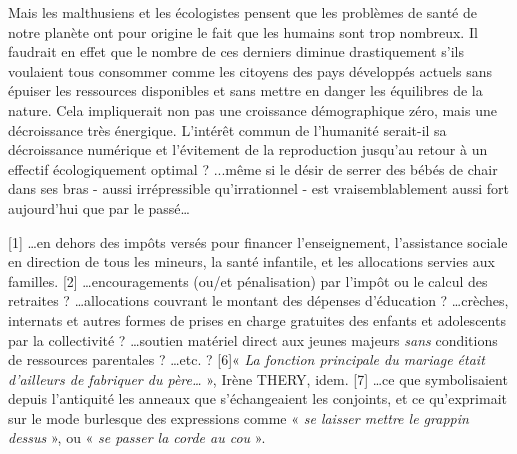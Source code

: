  Mais les malthusiens et les écologistes pensent que les problèmes de santé de notre planète ont pour origine le fait que les humains sont trop nombreux. Il faudrait en effet que le nombre de ces derniers diminue drastiquement s'ils voulaient tous consommer comme les citoyens des pays développés actuels sans épuiser les ressources disponibles et sans mettre en danger les équilibres de la nature. Cela impliquerait non pas une croissance démographique zéro, mais une décroissance très énergique. L'intérêt commun de l'humanité serait-il sa décroissance numérique et l'évitement de la reproduction jusqu'au retour à un effectif écologiquement optimal ? 
 ...même si le désir de serrer des bébés de chair dans ses bras - aussi irrépressible qu'irrationnel - est vraisemblablement aussi fort aujourd'hui que par le passé…
 
[1] …en dehors des impôts versés pour financer l'enseignement, l'assistance sociale en direction de tous les mineurs, la santé infantile, et les allocations servies aux familles.
[2] …encouragements (ou/et pénalisation) par l'impôt ou le calcul des retraites ? …allocations couvrant le montant des dépenses d'éducation ? …crèches, internats et autres formes de prises en charge gratuites des enfants et adolescents par la collectivité ? …soutien matériel direct aux jeunes majeurs \emph{sans} conditions de ressources parentales ? …etc. ?
[6]« \emph{La fonction principale du mariage était d'ailleurs de fabriquer du père…} », Irène THERY, idem.
[7] …ce que symbolisaient depuis l'antiquité les anneaux que s'échangeaient les conjoints, et ce qu'exprimait sur le mode burlesque des expressions comme « \emph{se laisser mettre le grappin dessus} », ou « \emph{se passer la corde au cou} ».